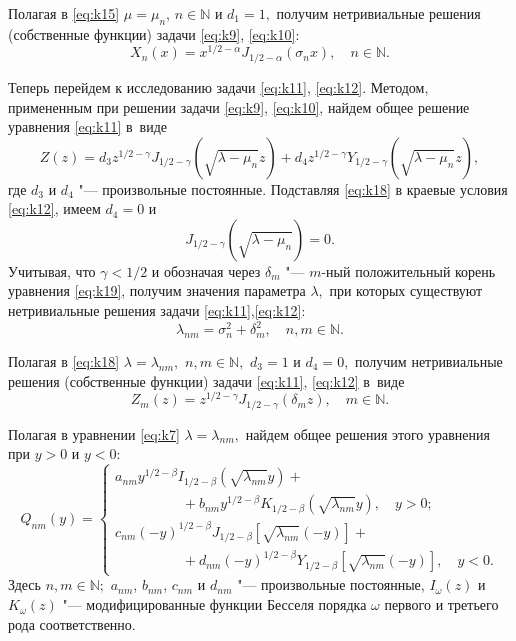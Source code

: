 Полагая в \eqref{eq:k15} $\mu=\mu_n$, $n\in \mathbb N $ и $d_1=1,$ получим нетривиальные решения (собственные функции) задачи \eqref{eq:k9}, \eqref{eq:k10}:
\begin{equation}
X_n(x)=x^{ 1/2 -\alpha}J_{ 1/2 -\alpha}(\sigma_n x),\quad n \in \mathbb N.
\label{eq:k17}
\end{equation}

Теперь перейдем к исследованию задачи \eqref{eq:k11}, \eqref{eq:k12}. 
Методом, примененным при решении задачи \eqref{eq:k9}, \eqref{eq:k10}, найдем общее решение уравнения \eqref{eq:k11} в~виде
\begin{equation}
Z(z)=d_3 z^{ 1/2 -\gamma}J_{ 1/2 -\gamma}(\sqrt{\lambda-\mu_n}z)+d_4 z^{ 1/2 -\gamma}Y_{1/2-\gamma}(\sqrt{\lambda-\mu_n}z),
\label{eq:k18}
\end{equation}
где $d_3 $ и $d_4$ "--- произвольные постоянные.
Подставляя \eqref{eq:k18} в краевые условия \eqref{eq:k12}, имеем $d_4=0$ и
\begin{equation}
J_{ 1/2 -\gamma}(\sqrt{\lambda-\mu_n})=0.
\label{eq:k19}
\end{equation}
Учитывая, что $\gamma< 1/2 $ и обозначая через $\delta_m$ "--- $m$-ный положительный корень уравнения \eqref{eq:k19}, получим значения параметра $\lambda,$ при которых существуют нетривиальные решения задачи \eqref{eq:k11},\eqref{eq:k12}: 
$$\lambda_{nm}=\sigma_n^2+\delta_m^2, \quad n,m\in \mathbb  N.$$

Полагая в \eqref{eq:k18} $\lambda=\lambda_{nm},$ $n, m  \in \mathbb  N,$ $d_3=1$ и $d_4=0,$ получим нетривиальные решения (собственные функции) задачи \eqref{eq:k11}, \eqref{eq:k12}  в~виде
\begin{equation}
Z_m(z)=z^{ 1/2 -\gamma}J_{ 1/2 -\gamma}(\delta_m z),\quad m \in \mathbb N.
\label{eq:k20}
\end{equation}

Полагая в уравнении \eqref{eq:k7} $\lambda=\lambda _{nm},$ найдем общее решения этого уравнения при $y > 0$ и $y < 0$:
\begin{equation}
Q_{nm}(y)=\left\{ 
\begin{array}{l}
a_{nm}y^{ 1/2 -\beta}I_{ 1/2 -\beta}(\sqrt{\lambda_{nm}}y)+  
\\
\hspace{2cm} +b_{nm}y^{ 1/2 -\beta}K_{ 1/2 -\beta}(\sqrt{\lambda_{nm}}y),\quad y>0;
\\[2mm]
c_{nm}(-y)^{ 1/2 -\beta}J_{ 1/2 -\beta}[\sqrt{\lambda_{nm}}(-y)] +  
\\
\hspace{2cm} +d_{nm}(-y)^{ 1/2 -\beta}Y_{1/2-\beta}[\sqrt{\lambda_{nm}}(-y)],\quad y<0.
\end{array} \right.
\label{eq:k21}
\end{equation}
Здесь $n,m \in \mathbb N;$ $a_{nm}$, $b_{nm}$, $c_{nm}$ и $d_{nm}$ "--- произвольные постоянные, 
$I_\omega(z)$  и $K_\omega(z)$ "--- модифицированные функции Бесселя порядка $\omega $ первого и третьего рода \cite[\S~3.7]{uk:bib:Vatson} соответственно.


